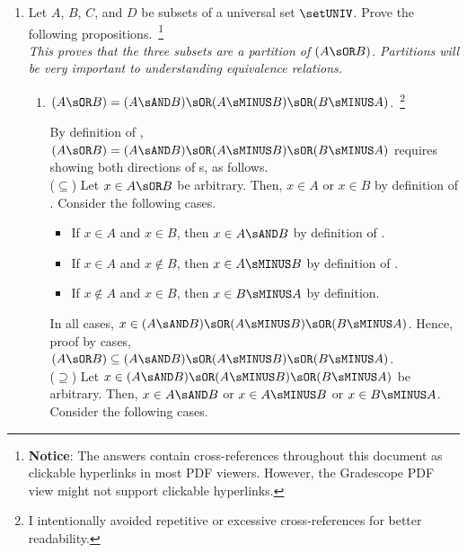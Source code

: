 \begin{enumerate} 
  \newpage
  \item Let $A$, $B$, $C$, and $D$ be subsets of a universal set $\setUNIV$. 
  Prove the following propositions.~\footnote{
    \textbf{Notice}: The answers contain cross-references throughout this document as clickable hyperlinks in most PDF viewers. 
    However, the Gradescope PDF view might not support clickable hyperlinks.
  }\\
  \textit{This proves that the three subsets are a partition of $(A \sOR B)$. Partitions will be very important to understanding equivalence relations.}
  \begin{enumerate}
    \item $(A \sOR B)=(A \sAND B) \sOR(A \sMINUS B) \sOR(B \sMINUS A)$.~\footnote{
      I intentionally avoided repetitive or excessive cross-references for better readability.
    }
    \begin{subprove}
      By definition of , $(A \sOR B)=(A \sAND B) \sOR(A \sMINUS B) \sOR(B \sMINUS A)$ 
      requires showing both directions of s, as follows.\vspace*{5px}\\
      ($\subseteq$) Let $x \in A \sOR B$ be arbitrary. Then, $x \in A$ or $x \in B$ 
      by definition of . Consider the following cases.
      \begin{itemize}
        \item If $x \in A$ and $x \in B$, then $x \in A \sAND B$ by definition of .
        \item If $x \in A$ and $x \notin B$, then $x \in A \sMINUS B$ by definition of .
        \item If $x \notin A$ and $x \in B$, then $x \in B \sMINUS A$ by definition.
      \end{itemize}
      In all cases, $x \in (A \sAND B) \sOR(A \sMINUS B) \sOR(B \sMINUS A)$. 
      Hence, proof by cases, $(A \sOR B) \subseteq (A \sAND B) \sOR(A \sMINUS B) \sOR(B \sMINUS A)$.\vspace*{5px}\\
      ($\supseteq$) Let $x \in (A \sAND B) \sOR(A \sMINUS B) \sOR(B \sMINUS A)$ be arbitrary. 
      Then, $x \in A \sAND B$ or $x \in A \sMINUS B$ or $x \in B \sMINUS A$. Consider the following cases.

\end{subprove}
\end{enumerate}
\end{enumerate}
